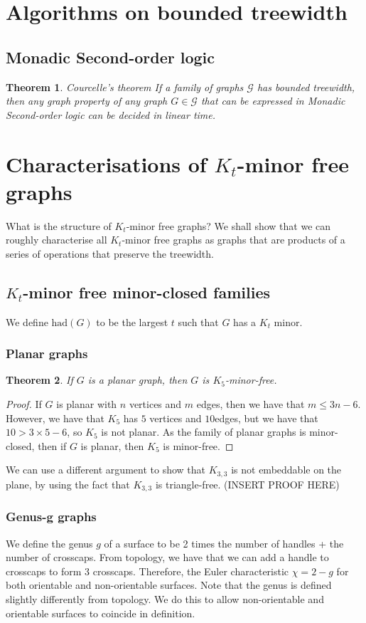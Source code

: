 \documentclass[]{article}
\newcommand{\had}{\text{had}}
\newtheorem{theorem}{Theorem}
\theoremstyle{definition}
\numberwithin{theorem}{section}
\numberwithin{equation}{section}
\begin{document}
\section{Algorithms on bounded treewidth}
\subsection{Monadic Second-order logic}
\begin{theorem}{Courcelle's theorem}
	If a family of graphs $\mathcal{G}$ has bounded treewidth, then any graph property of any graph $G \in \mathcal{G}$ that can be expressed in Monadic Second-order logic can be decided in linear time. 
\end{theorem}

\section{Characterisations of $K_t$-minor free graphs}
What is the structure of $K_t$-minor free graphs? We shall show that we can roughly characterise all $K_t$-minor free graphs as graphs that are products of a series of operations that preserve the treewidth. 
\subsection{$K_t$-minor free minor-closed families}
We define $\had(G)$ to be the largest $t$ such that $G$ has a $K_t$ minor. 
\subsubsection{Planar graphs}
\begin{theorem}
	If $G$ is a planar graph, then $G$ is $K_5$-minor-free.
\end{theorem}
\begin{proof}
	If $G$ is planar with $n$ vertices and $m$ edges, then we have that $m \leq 3n -6$. However, we have that $K_5$ has $5$ vertices and $10$edges, but we have that $ 10 > 3 \times 5 - 6$, so $K_5$ is not planar. As the family of planar graphs is minor-closed, then if $G$ is planar, then $K_5$ is minor-free.
\end{proof}

We can use a different argument to show that $K_{3,3}$ is not embeddable on the plane, by using the fact that $K_{3,3}$ is triangle-free. 
(INSERT PROOF HERE)

\subsubsection{Genus-g graphs}
We define the genus $g$ of a surface to be 2 times the number of handles + the number of crosscaps. From topology, we have that we can add a handle to crosscaps to form 3 crosscaps. Therefore, the Euler characteristic $\chi = 2 - g$ for both orientable and non-orientable surfaces. Note that the genus is defined slightly differently from topology. We do this to allow non-orientable and orientable surfaces to coincide in definition.
\end{document}
